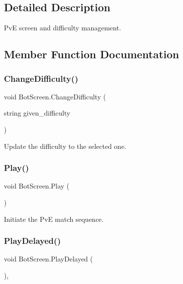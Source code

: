 \subsection{Detailed Description}
PvE screen and difficulty management. 

\subsection{Member Function Documentation}
\mbox{\label{class_bot_screen_a0d4926b1ac8cb0e45f72b127cd297f94}} 
\subsubsection{\texorpdfstring{ChangeDifficulty()}{ChangeDifficulty()}}
{\footnotesize\ttfamily void Bot\+Screen.\+Change\+Difficulty (\begin{DoxyParamCaption}\item[{string}]{given\+\_\+difficulty }\end{DoxyParamCaption})\hspace{0.3cm}{\ttfamily [inline]}}



Update the difficulty to the selected one. 

\mbox{\label{class_bot_screen_a594089f360bedf3ae9aff037401a504c}} 
\subsubsection{\texorpdfstring{Play()}{Play()}}
{\footnotesize\ttfamily void Bot\+Screen.\+Play (\begin{DoxyParamCaption}{ }\end{DoxyParamCaption})\hspace{0.3cm}{\ttfamily [inline]}}



Initiate the PvE match sequence. 

\mbox{\label{class_bot_screen_a4d2d8d3ba5b06b185ee0ee039dbdcdd4}} 
\subsubsection{\texorpdfstring{PlayDelayed()}{PlayDelayed()}}
{\footnotesize\ttfamily void Bot\+Screen.\+Play\+Delayed (\begin{DoxyParamCaption}{ }\end{DoxyParamCaption})\hspace{0.3cm}{\ttfamily [inline]}, {\ttfamily [private]}}




